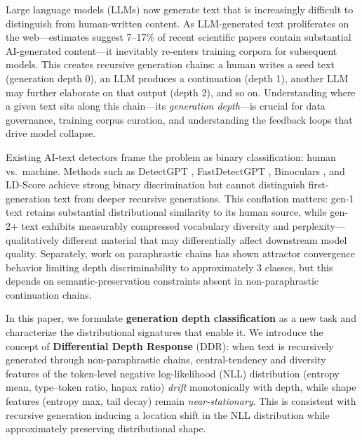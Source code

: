 \documentclass[11pt,a4paper]{article}
\begin{document}
Large language models (LLMs) now generate text that is increasingly difficult to distinguish from human-written content.
As LLM-generated text proliferates on the web---estimates suggest 7--17\% of recent scientific papers contain substantial AI-generated content---it inevitably re-enters training corpora for subsequent models.
This creates recursive generation chains: a human writes a seed text (generation depth 0),
an LLM produces a continuation (depth 1), another LLM may further elaborate on that output (depth 2), and so on.
Understanding where a given text sits along this chain---its \emph{generation depth}---is crucial for data governance,
training corpus curation, and understanding the feedback loops that drive model collapse.

Existing AI-text detectors frame the problem as binary classification: human vs.\ machine.
Methods such as DetectGPT \citep{mitchell2023detectgpt}, FastDetectGPT \citep{bao2024fastdetectgpt}, Binoculars \citep{hans2024binoculars}, and LD-Score \citep{tulchinskii2024ldscore}
achieve strong binary discrimination but cannot distinguish first-generation text from deeper recursive generations.
This conflation matters: gen-1 text retains substantial distributional similarity to its human source,
while gen-2+ text exhibits measurably compressed vocabulary diversity and perplexity---qualitatively different material that may differentially affect downstream model quality.
Separately, work on paraphrastic chains \citep{briesch2025llmbrokenphone} has shown attractor convergence behavior limiting depth discriminability to approximately 3 classes,
but this depends on semantic-preservation constraints absent in non-paraphrastic continuation chains.

In this paper, we formulate \textbf{generation depth classification} as a new task and characterize the distributional signatures that enable it.
We introduce the concept of \textbf{Differential Depth Response} (DDR):
when text is recursively generated through non-paraphrastic chains,
central-tendency and diversity features of the token-level negative log-likelihood (NLL) distribution
(entropy mean, type--token ratio, hapax ratio) \emph{drift} monotonically with depth,
while shape features (entropy max, tail decay) remain \emph{near-stationary}.
This is consistent with recursive generation inducing a location shift in the NLL distribution while approximately preserving distributional shape.
\end{document}
